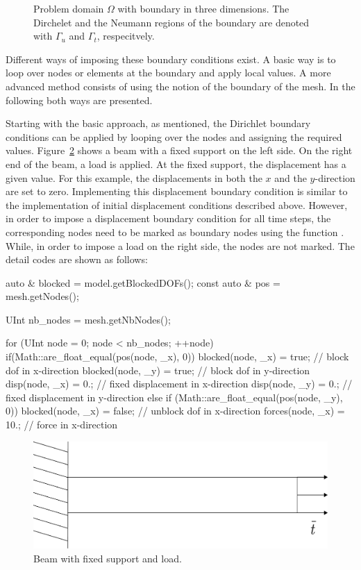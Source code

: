\begin{figure} \centering
\def\svgwidth{0.5\columnwidth}
  
  \caption{Problem domain $\Omega$ with boundary in three
    dimensions. The Dirchelet and the Neumann regions of the boundary
    are denoted with $\Gamma_u$ and $\Gamma_t$,
    respecitvely.\label{fig:smm:boundaries}}
  \label{fig:problemDomain}
\end{figure}

Different ways of imposing these boundary conditions exist. A basic
way is to loop over nodes or elements at the boundary and apply local
values. A more advanced method consists of using the notion of the
boundary of the mesh. In the following both ways are presented.

Starting with the basic approach, as mentioned, the Dirichlet boundary
conditions can be applied by looping over the nodes and assigning the
required values. Figure~\ref{fig:smm:dirichlet_bc} shows a beam with a
fixed support on the left side. On the right end of the beam, a load
is applied. At the fixed support, the displacement has a given
value. For this example, the displacements in both the $x$ and the
$y$-direction are set to zero. Implementing this displacement boundary
condition is similar to the implementation of initial displacement
conditions described above. However, in order to impose a displacement
boundary condition for all time steps, the corresponding nodes need to
be marked as boundary nodes using the function . While, 
in order to impose a load on the right side, the nodes are not marked.
The detail codes are shown as follows:

\begin{cpp}
auto & blocked = model.getBlockedDOFs();
const auto & pos = mesh.getNodes();

UInt nb_nodes = mesh.getNbNodes();

for (UInt node = 0; node < nb_nodes; ++node) {
  if(Math::are_float_equal(pos(node, _x), 0)) {
    blocked(node, _x) = true; // block dof in x-direction
    blocked(node, _y) = true; // block dof in y-direction
    disp(node, _x) = 0.; // fixed displacement in x-direction
    disp(node, _y) = 0.; // fixed displacement in y-direction
  } else if (Math::are_float_equal(pos(node, _y), 0)) {
    blocked(node, _x) = false; // unblock dof in x-direction
    forces(node, _x) = 10.;    // force in x-direction
  }
}
\end{cpp}

\begin{figure}[!htb]
  \centering
  \includegraphics[scale=0.4]{figures/dirichlet}
  \caption{Beam with fixed support and load.\label{fig:smm:dirichlet_bc}}
\end{figure}


